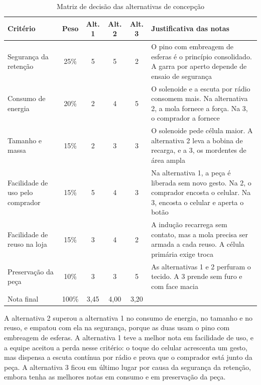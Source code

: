 \begin{table}[htbp]
    \centering
    \caption{Matriz de decisão das alternativas de concepção}
    \label{tab:reform_decisao}
    \footnotesize
    \renewcommand{\arraystretch}{1.3}
    \begin{tabularx}{\textwidth}{@{}
        >{\RaggedRight\arraybackslash}p{3.1cm}
        c c c c
        >{\RaggedRight\arraybackslash}X@{}}
        \toprule
        \textbf{Critério} & \textbf{Peso} & \textbf{Alt. 1} & \textbf{Alt. 2} & \textbf{Alt. 3} & \textbf{Justificativa das notas} \\
        \midrule
        Segurança da retenção & 25\% & 5 & 5 & 2 & O pino com embreagem de esferas é o princípio consolidado. A garra por aperto depende de ensaio de segurança \\
        Consumo de energia & 20\% & 2 & 4 & 5 & O solenoide e a escuta por rádio consomem mais. Na alternativa 2, a mola fornece a força. Na 3, o comprador a fornece \\
        Tamanho e massa & 15\% & 2 & 3 & 3 & O solenoide pede célula maior. A alternativa 2 leva a bobina de recarga, e a 3, os mordentes de área ampla \\
        Facilidade de uso pelo comprador & 15\% & 5 & 4 & 3 & Na alternativa 1, a peça é liberada sem novo gesto. Na 2, o comprador encosta o celular. Na 3, encosta o celular e aperta o botão \\
        Facilidade de reuso na loja & 15\% & 3 & 4 & 2 & A indução recarrega sem contato, mas a mola precisa ser armada a cada reuso. A célula primária exige troca \\
        Preservação da peça & 10\% & 3 & 3 & 5 & As alternativas 1 e 2 perfuram o tecido. A 3 prende sem furo e com face macia \\
        \midrule
        Nota final & 100\% & 3,45 & 4,00 & 3,20 & \\
        \bottomrule
    \end{tabularx}
\end{table}

A alternativa 2 superou a alternativa 1 no consumo de energia, no tamanho e no reuso, e empatou com ela na segurança, porque as duas usam o pino com embreagem de esferas. A alternativa 1 teve a melhor nota em facilidade de uso, e a equipe aceitou a perda nesse critério: o toque do celular acrescenta um gesto, mas dispensa a escuta contínua por rádio e prova que o comprador está junto da peça. A alternativa 3 ficou em último lugar por causa da segurança da retenção, embora tenha as melhores notas em consumo e em preservação da peça.

